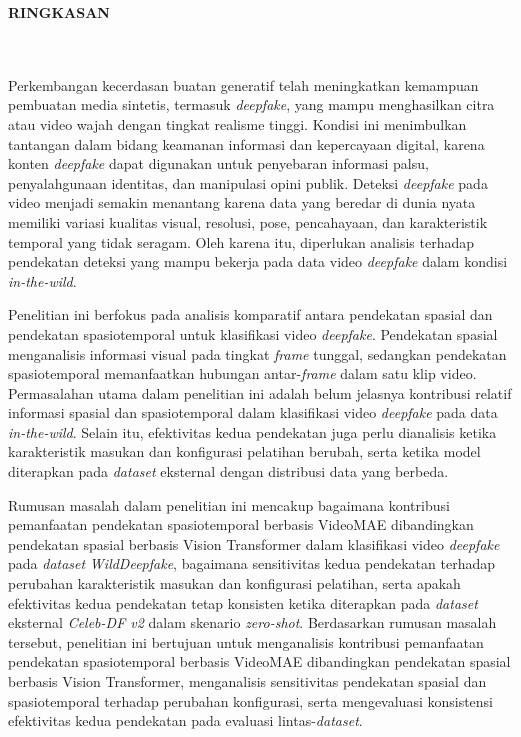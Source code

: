 \clearpage
{}%
\thispagestyle{fancy}

\begin{center}
	\large \bfseries \MakeUppercase{Ringkasan}\\
	\normalsize \normalfont {\thetitle}\\
	\normalsize \normalfont {\theauthor}\\
	\bigskip
	
	\normalsize \normalfont \justifying
	Perkembangan kecerdasan buatan generatif telah meningkatkan kemampuan pembuatan media sintetis, termasuk \textit{deepfake}, yang mampu menghasilkan citra atau video wajah dengan tingkat realisme tinggi. Kondisi ini menimbulkan tantangan dalam bidang keamanan informasi dan kepercayaan digital, karena konten \textit{deepfake} dapat digunakan untuk penyebaran informasi palsu, penyalahgunaan identitas, dan manipulasi opini publik. Deteksi \textit{deepfake} pada video menjadi semakin menantang karena data yang beredar di dunia nyata memiliki variasi kualitas visual, resolusi, pose, pencahayaan, dan karakteristik temporal yang tidak seragam. Oleh karena itu, diperlukan analisis terhadap pendekatan deteksi yang mampu bekerja pada data video \textit{deepfake} dalam kondisi \textit{in-the-wild}. \par

	Penelitian ini berfokus pada analisis komparatif antara pendekatan spasial dan pendekatan spasiotemporal untuk klasifikasi video \textit{deepfake}. Pendekatan spasial menganalisis informasi visual pada tingkat \textit{frame} tunggal, sedangkan pendekatan spasiotemporal memanfaatkan hubungan antar-\textit{frame} dalam satu klip video. Permasalahan utama dalam penelitian ini adalah belum jelasnya kontribusi relatif informasi spasial dan spasiotemporal dalam klasifikasi video \textit{deepfake} pada data \textit{in-the-wild}. Selain itu, efektivitas kedua pendekatan juga perlu dianalisis ketika karakteristik masukan dan konfigurasi pelatihan berubah, serta ketika model diterapkan pada \textit{dataset} eksternal dengan distribusi data yang berbeda. \par

	Rumusan masalah dalam penelitian ini mencakup bagaimana kontribusi pemanfaatan pendekatan spasiotemporal berbasis VideoMAE dibandingkan pendekatan spasial berbasis Vision Transformer dalam klasifikasi video \textit{deepfake} pada \textit{dataset} \textit{WildDeepfake}, bagaimana sensitivitas kedua pendekatan terhadap perubahan karakteristik masukan dan konfigurasi pelatihan, serta apakah efektivitas kedua pendekatan tetap konsisten ketika diterapkan pada \textit{dataset} eksternal \textit{Celeb-DF v2} dalam skenario \textit{zero-shot}. Berdasarkan rumusan masalah tersebut, penelitian ini bertujuan untuk menganalisis kontribusi pemanfaatan pendekatan spasiotemporal berbasis VideoMAE dibandingkan pendekatan spasial berbasis Vision Transformer, menganalisis sensitivitas pendekatan spasial dan spasiotemporal terhadap perubahan konfigurasi, serta mengevaluasi konsistensi efektivitas kedua pendekatan pada evaluasi lintas-\textit{dataset}. \par


\end{center}
